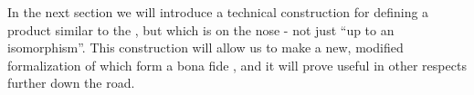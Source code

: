 In the next section we will introduce a technical construction for defining a product similar to the , but which is  on the nose - not just ``up to an isomorphism''.
This construction will allow us to make a new, modified formalization of  which form a bona fide , and it will prove useful in other respects further down the road.
\showslides{
    \begin{forslides}
        \begin{equation}
            \label{eq:moore-assoc-a}
            \mora \mthen (\morb \mthen \morc)
        \end{equation}
        \begin{equation}
            \label{eq:moore-assoc-b}
            (\mora \mthen \morb) \mthen \morc
        \end{equation}
    \end{forslides}
}